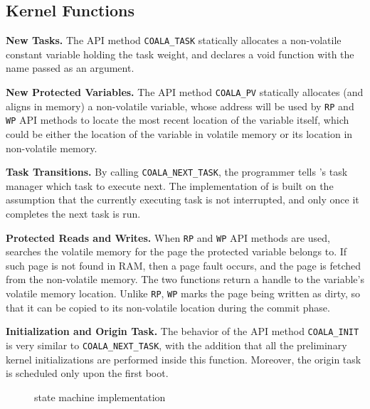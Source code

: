 \subsection{Kernel Functions}

\textbf{New Tasks.} The API method \texttt{COALA\_TASK} statically allocates a non-volatile constant variable holding the task weight, and declares a void function with the name passed as an argument.

\textbf{New Protected Variables.} The API method \texttt{COALA\_PV} statically allocates (and aligns in memory) a non-volatile variable, whose address will be used by \texttt{RP} and \texttt{WP} API methods to locate the most recent location of the variable itself, which could be either the location of the variable in volatile memory or its location in non-volatile memory.

\textbf{Task Transitions.} By calling \texttt{COALA\_NEXT\_TASK}, the programmer tells \sys's task manager which task to execute next. The implementation of \sys is built on the assumption that the currently executing task is not interrupted, and only once it completes the next task is run.

\textbf{Protected Reads and Writes.} When \texttt{RP} and \texttt{WP} API methods are used, \sys searches the volatile memory for the page the protected variable belongs to. If such page is not found in RAM, then a page fault occurs, and the page is fetched from the non-volatile memory. The two functions return a handle to the variable's volatile memory location. Unlike \texttt{RP}, \texttt{WP} marks the page being written as dirty, so that it can be copied to its non-volatile location during the commit phase.

\textbf{Initialization and Origin Task.} The behavior of the API method \texttt{COALA\_INIT} is very similar to \texttt{COALA\_NEXT\_TASK}, with the addition that all the preliminary kernel initializations are performed inside this function. Moreover, the origin task is scheduled only upon the first boot.

\begin{figure}
	\centering
	\caption{\sys state machine implementation }
	\label{fig:coala_state_machine}
\end{figure}

